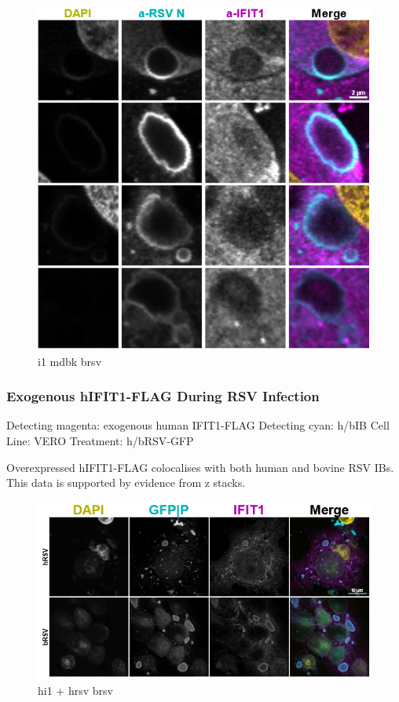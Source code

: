 \begin{figure}
    \centering
    \includegraphics[width=1\linewidth]{09. Chapter 4/Figs/03. IFIT1/06. mdbk brsv.png}
    \caption[i1 mdbk brsv]{i1 mdbk brsv}
    \label{fig:i1 mdbk brsv}
\end{figure}

\subsubsection{Exogenous hIFIT1-FLAG During RSV Infection} \label{Exogenous hIFIT1-FLAG During RSV Infection}
Detecting magenta: exogenous human IFIT1-FLAG \newline
Detecting cyan: h/bIB \newline
Cell Line: VERO \newline
Treatment: h/bRSV-GFP \newline

Overexpressed hIFIT1-FLAG colocalises with both human and bovine RSV IBs. This data is supported by evidence from z stacks.

\begin{figure}
    \centering
    \includegraphics[width=1\linewidth]{09. Chapter 4/Figs/03. IFIT1/07. hi1 hrsv brsv.png}
    \caption[hi1 + hrsv brsv]{hi1 + hrsv brsv}
    \label{fig:hi1 + hrsv brsv}
\end{figure}

